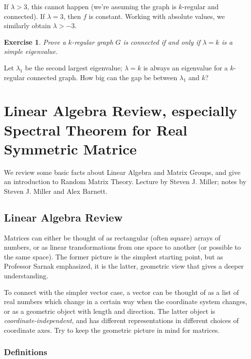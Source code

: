 \documentclass[12pt,letterpaper]{report}
\newtheorem{exe}[thm]{Exercise}
\begin{document}
If $\lambda > 3$, this cannot happen (we're assuming the graph is
$k$-regular and connected). If $\lambda = 3$, then $f$ is
constant. Working with absolute values, we similarly obtain
$\lambda
> -3$.

\begin{exe} Prove a $k$-regular graph $G$ is connected if and only if $\lambda = k$ is
a simple eigenvalue. \end{exe}

Let $\lambda_1$ be the second largest eigenvalue; $\lambda = k$ is
always an eigenvalue for a $k$-regular connected graph. How big
can the gap be between $\lambda_1$ and $k$?





\chapter{Linear Algebra Review, especially Spectral Theorem for Real Symmetric Matrice}

We review some basic facts about Linear Algebra and Matrix Groups,
and give an introduction to Random Matrix Theory. Lecture by
Steven J. Miller; notes by Steven J. Miller and Alex Barnett.

\section{Linear Algebra Review}

Matrices can either be thought of as rectangular (often square)
arrays of numbers, or as linear transformations from one space to
another (or possible to the same space). The former picture is the
simplest starting point, but as Professor Sarnak emphasized, it is
the latter, geometric view that gives a deeper understanding.

To connect with the simpler vector case, a vector can be thought
of as a list of real numbers which change in a certain way when
the coordinate system changes, or as a geometric object with
length and direction. The latter object is {\em
coordinate-independent}, and has different representations in
different choices of coordinate axes. Try to keep the geometric
picture in mind for matrices.

\subsection{Definitions}
\end{document}
